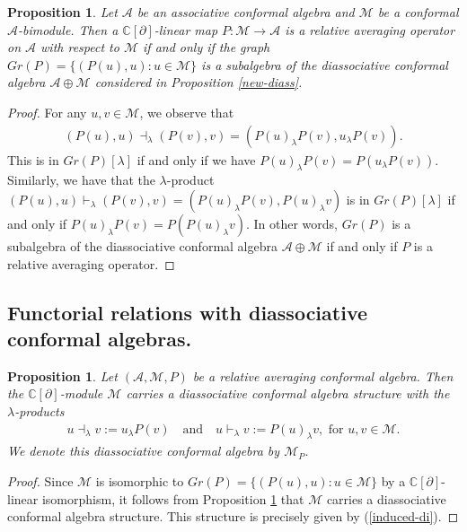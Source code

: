 \documentclass[a4paper,reqno,10pt]{amsart}
\theoremstyle{plain}
\newtheorem{proposition}[thm]{Proposition}
\theoremstyle{definition}
\theoremstyle{remark}
\newcommand{\C}{\mathbb{C}}
\newcommand{\M}{\mathcal{M}}
\newcommand{\p}{\partial}
\newcommand{\la}{\lambda}
\begin{document}
\begin{proposition}\label{prop-graph}
    Let $\mathcal{A}$ be an associative conformal algebra and $\M$ be a conformal $\mathcal{A}$-bimodule. Then a $\C[\p]$-linear map $P: \M \to \mathcal{A}$ is a relative averaging operator on $\mathcal{A}$ with respect to $\M$ if and only if the graph $Gr(P) = \{(P(u),u) :  u\in \M\}$ is a subalgebra of the diassociative conformal algebra $\mathcal{A} \oplus \M$ considered in Proposition \ref{new-diass}.
\end{proposition}

\begin{proof}
  For any $u,v \in \M$, we observe that
  \begin{align*}
  (P(u),u) \dashv_{\la} (P(v),v)=(P(u)_{\la}P(v), u_{\la}P(v)).
  \end{align*}
  This is in ${Gr}(P)[\la]$ if and only if we have $P(u)_{\la}P(v)= P(u_{\la}P(v))$. Similarly, we have that the $\la$-product $(P(u),u) \vdash_{\la} (P(v),v)=(P(u)_{\la}P(v), P(u)_{\la}v)$ is in ${Gr}(P)[\la]$ if and only if $P(u)_{\la}P(v)= P(P(u)_{\la}v)$. In other words, ${Gr}(P)$ is a subalgebra of the diassociative conformal algebra $\mathcal{A} \oplus \M$ if and only if $P$ is a relative averaging operator.
\end{proof}

\subsection*{Functorial relations with diassociative conformal algebras.}
\begin{proposition} \label{prop*}
    Let $(\mathcal{A}, \M, P)$ be a relative averaging conformal algebra. Then the $\C[\p]$-module $\M$ carries a diassociative conformal algebra structure with the $\la$-products
    \begin{align}\label{induced-di}
        u \dashv_{\la} v := u_{\la} P(v) ~~~ \text{ and } ~~~ u \vdash_{\la} v := P(u)_{\la} v,  \text{ for } u, v \in \M.
    \end{align}
We denote this diassociative conformal algebra by $\M_{P}$.
\end{proposition}

\begin{proof}
Since $\M$ is isomorphic to ${Gr}(P) = \{(P(u),u) :  u\in \M\}$ by a $\C [\partial]$-linear isomorphism, it follows from Proposition \ref{prop-graph} that $\M$ carries a diassociative conformal algebra structure. This structure is precisely given by (\ref{induced-di}).
\end{proof}
\end{document}
